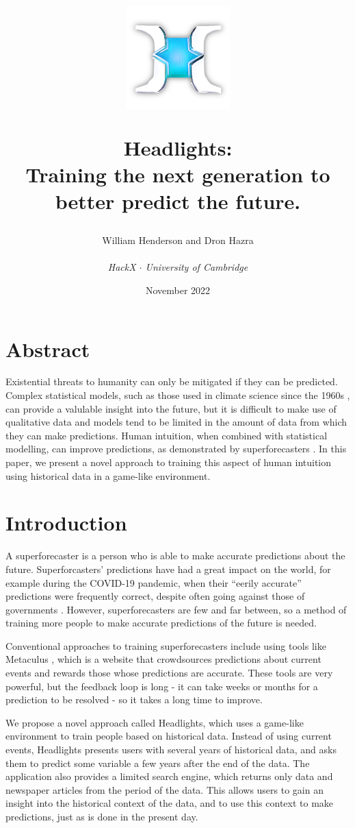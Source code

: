 \documentclass{article}
\title{
\begin{center}
\includegraphics[width=0.3\textwidth]{logo.png}
\end{center}  

\textbf{Headlights}: \\
Training the next generation to \\
better predict the future.}
\author{William Henderson and Dron Hazra \\
\\
\textit{HackX $\cdot$ University of Cambridge}
}
\date{November 2022}
\begin{document}
\maketitle

\section{Abstract}

Existential threats to humanity can only be mitigated if they can be predicted. Complex statistical models, such as those used in climate science since the 1960s \cite{noaa}, can provide a valulable insight into the future, but it is difficult to make use of qualitative data and models tend to be limited in the amount of data from which they can make predictions. Human intuition, when combined with statistical modelling, can improve predictions, as demonstrated by superforecasters \cite{superforecasters}. In this paper, we present a novel approach to training this aspect of human intuition using historical data in a game-like environment.

\section{Introduction}

A superforecaster is a person who is able to make accurate predictions about the future. Superforcasters' predictions have had a great impact on the world, for example during the COVID-19 pandemic, when their ``eerily accurate'' predictions were frequently correct, despite often going against those of governments \cite{covid19}. However, superforecasters are few and far between, so a method of training more people to make accurate predictions of the future is needed.

Conventional approaches to training superforecasters include using tools like Metaculus \cite{metaculus}, which is a website that crowdsources predictions about current events and rewards those whose predictions are accurate. These tools are very powerful, but the feedback loop is long - it can take weeks or months for a prediction to be resolved - so it takes a long time to improve.

We propose a novel approach called Headlights, which uses a game-like environment to train people based on historical data. Instead of using current events, Headlights presents users with several years of historical data, and asks them to predict some variable a few years after the end of the data. The application also provides a limited search engine, which returns only data and newspaper articles from the period of the data. This allows users to gain an insight into the historical context of the data, and to use this context to make predictions, just as is done in the present day.
\end{document}
